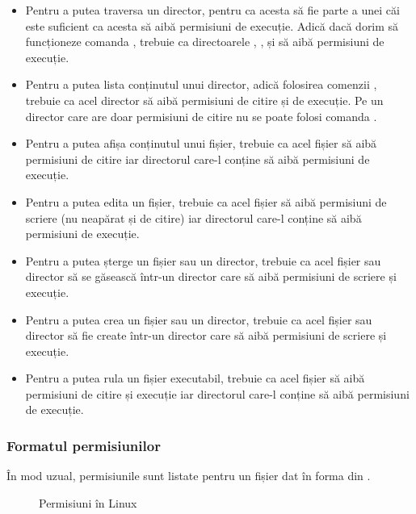\begin{itemize}
	\item Pentru a putea traversa un director, pentru ca acesta să fie parte
		a unei căi este suficient ca acesta să aibă permisiuni de
                execuție. Adică dacă dorim să funcționeze comanda , trebuie ca directoarele , ,  și  să aibă
		permisiuni de execuție.
	\item Pentru a putea lista conținutul unui director, adică folosirea
          comenzii , trebuie ca acel director să aibă permisiuni de
		citire și de execuție. Pe un director care are doar permisiuni
                de citire nu se poate folosi comanda .
	\item Pentru a putea afișa conținutul unui fișier, trebuie ca acel
		fișier să aibă permisiuni de citire iar directorul care-l
		conține să aibă permisiuni de execuție.
	\item Pentru a putea edita un fișier, trebuie ca acel fișier să aibă
		permisiuni de scriere (nu neapărat și de citire) iar directorul
		care-l conține să aibă permisiuni de execuție.
	\item Pentru a putea șterge un fișier sau un director, trebuie ca acel
		fișier sau director să se găsească într-un director care să aibă
		permisiuni de scriere și execuție.
	\item Pentru a putea crea un fișier sau un director, trebuie ca acel
		fișier sau director să fie create într-un director care să aibă
		permisiuni de scriere și execuție.
	\item Pentru a putea rula un fișier executabil, trebuie ca acel fișier
		să aibă permisiuni de citire și execuție iar directorul care-l
		conține să aibă permisiuni de execuție.
\end{itemize}

\subsubsection{Formatul permisiunilor}
\label{sec:user:perm-format}

În mod uzual, permisiunile sunt listate pentru un fișier dat în forma din .

\begin{figure}[htbp]
	\centering
	\def\svgwidth{0.7\columnwidth}
	
        \caption{Permisiuni în Linux}
	\label{fig:user:octal-perm}
\end{figure}

